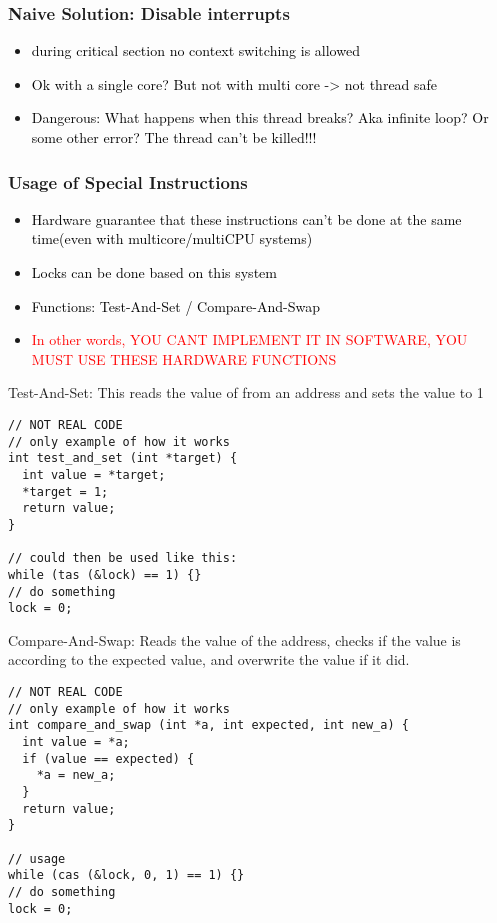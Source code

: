 \documentclass[main.tex,fontsize=8pt,paper=a4,paper=portrait,DIV=calc,]{scrartcl}
\begin{document}
\subsubsection{Naive Solution: Disable interrupts}
\begin{itemize}
\item \textcolor{black}{during critical section no context switching is allowed}
\item \textcolor{black}{Ok with a single core? But not with multi core -> not thread safe}
\item \textcolor{black}{Dangerous: What happens when this thread breaks? Aka infinite loop? Or some other error? The thread can't be killed!!!}
\end{itemize} 

\subsubsection{Usage of Special Instructions}
\begin{itemize}
\item \textcolor{black}{Hardware guarantee that these instructions can't be done at the same time(even with multicore/multiCPU systems)}
\item \textcolor{black}{Locks can be done based on this system}
\item \textcolor{black}{Functions: Test-And-Set / Compare-And-Swap}
\item \textcolor{red}{In other words, YOU CANT IMPLEMENT IT IN SOFTWARE, YOU MUST USE THESE HARDWARE FUNCTIONS}
\end{itemize} 
Test-And-Set:\newline
This reads the value of from an address and sets the value to 1
\begin{lstlisting}
// NOT REAL CODE
// only example of how it works
int test_and_set (int *target) {
  int value = *target;
  *target = 1;
  return value;
}

// could then be used like this:
while (tas (&lock) == 1) {}
// do something
lock = 0;
\end{lstlisting}
Compare-And-Swap:\newline
Reads the value of the address, checks if the value is according to the expected value, and overwrite the value if it did.
\begin{lstlisting}
// NOT REAL CODE
// only example of how it works
int compare_and_swap (int *a, int expected, int new_a) {
  int value = *a;
  if (value == expected) {
    *a = new_a;
  }
  return value;
}

// usage
while (cas (&lock, 0, 1) == 1) {}
// do something
lock = 0;
\end{lstlisting}
\end{document}
